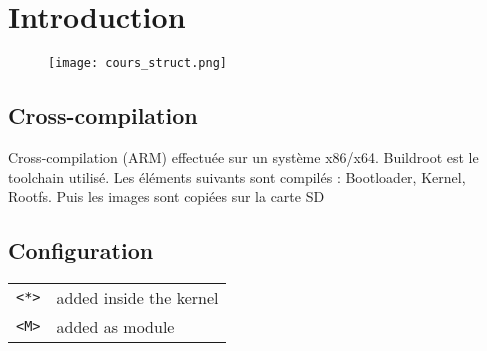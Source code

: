\section{Introduction}
\begin{figure}[H]
\centering
\texttt{[image: cours\_struct.png]}
\end{figure}
\subsection{Cross-compilation}
Cross-compilation (ARM) effectuée sur un système x86/x64. Buildroot est le toolchain utilisé. Les éléments suivants sont compilés : Bootloader, Kernel, Rootfs. Puis les images sont copiées sur la carte SD
\subsection{Configuration}
\begin{tabular}{ll}
    \verb+<*>+ & added inside the kernel\\
    \verb+<M>+ & added as module
\end{tabular}